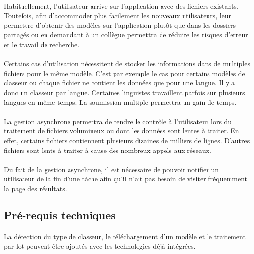 \paragraph{}
Habituellement, l'utilisateur arrive sur l'application avec des fichiers existants. Toutefois, afin d'accommoder plus facilement les nouveaux utilisateurs, leur permettre d'obtenir des modèles sur l'application plutôt que dans les dossiers partagés ou en demandant à un collègue permettra de réduire les risques d'erreur et le travail de recherche.

\paragraph{}
Certains cas d'utilisation nécessitent de stocker les informations dans de multiples fichiers pour le même modèle.
C'est par exemple le cas pour certains modèles de classeur ou chaque fichier ne contient les données que pour une langue.
Il y a donc un classeur par langue.
Certaines linguistes travaillent parfois sur plusieurs langues en même temps.
La soumission multiple permettra un gain de temps.

\paragraph{}
La gestion asynchrone permettra de rendre le contrôle à l'utilisateur lors du traitement de fichiers volumineux ou dont les données sont lentes à traiter.
En effet, certains fichiers contiennent plusieurs dizaines de milliers de lignes.
D'autres fichiers sont lents à traiter à cause des nombreux appels aux réseaux.

\paragraph{}
Du fait de la gestion asynchrone, il est nécessaire de pouvoir notifier un utilisateur de la fin d'une tâche afin qu'il n'ait pas besoin de visiter fréquemment la page des résultats.

\subsection{Pré-requis techniques}
\label{subsec:nex-version-technical-requirements}

\paragraph{}
La détection du type de classeur, le téléchargement d'un modèle et le traitement par lot peuvent être ajoutés avec les technologies déjà intégrées.

